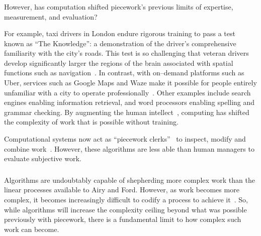 \documentclass[trackingWork]{subfiles}
\begin{document}
\subsubsection{\whatchanged}
\begin{comment}
  mangeerial overhead limits, so what's different
  more people can now do complex work without training (more complex)
  parts of management can be automated (more firms)
  cheaper to create the infrastructure (more complex)
\end{comment}

However, has computation shifted piecework's previous limits of expertise, measurement, and evaluation?

For example, taxi drivers in London endure rigorous training to pass a test known as ``The Knowledge'': a demonstration of the driver's comprehensive familiarity with the city's roads.
This test is so challenging that veteran drivers develop significantly larger
the regions of the brain associated with spatial functions such as navigation~\cite{Maguire11042000,Maguire2894,Skok:1999:KML:299513.299625,skok2000managing,Woollett1407,woollett2011acquiring}.
In contrast, with on--demand platforms such as Uber, services such as Google Maps and Waze make it possible for
people entirely unfamiliar with a city
to operate professionally~\cite{silva2013traffic,hind2014outsmarting}.
Other examples include search engines enabling information retrieval, and
word processors enabling spelling and grammar checking.
By augmenting the human intellect~\cite{engelbart2001augmenting},
computing has shifted the complexity of work that is possible without training.

Computational systems now act as ``piecework clerks''~\cite{10.2307/23702539} to
inspect,
modify and
combine work~\cite{turkopticon,takingAHITMcInnis}.
However, these algorithms are less able than human managers to evaluate subjective work.

\subsubsection{\implication}
Algorithms are undoubtably capable of shepherding more complex work than the linear processes available to Airy and Ford.
However, as work becomes more complex, it becomes increasingly difficult to codify a process to achieve it~\cite{Faraj2006a,edmondson2012teaming}.
So, while algorithms will increase the complexity ceiling beyond what was possible previously with piecework, there is a fundamental limit to how complex such work can become.
\end{document}
